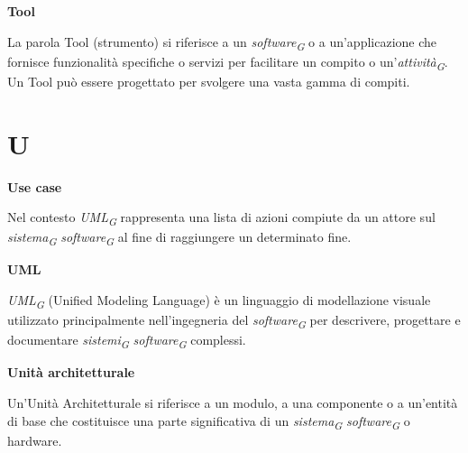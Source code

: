 \documentclass{article}
\begin{document}
\vspace{0.4cm}

\textbf{Tool}

\vspace{0.1cm}

La parola Tool (strumento) si riferisce a un \textit{software}\textsubscript{\textit{G}} o a un'applicazione che fornisce funzionalità specifiche o servizi per facilitare un compito o un'\textit{attività}\textsubscript{\textit{G}}. Un Tool può essere progettato per svolgere una vasta gamma di compiti.

\pagebreak
\section*{U}
{}

\vspace{0.4cm}

\textbf{Use case}

\vspace{0.1cm}

Nel contesto \textit{UML}\textsubscript{\textit{G}} rappresenta una lista di azioni compiute da un attore sul \textit{sistema}\textsubscript{\textit{G}} \textit{software}\textsubscript{\textit{G}} al fine di raggiungere un determinato fine.

\vspace{0.4cm}

\textbf{UML}

\vspace{0.1cm}

\textit{UML}\textsubscript{\textit{G}} (Unified Modeling Language) è un linguaggio di modellazione visuale utilizzato principalmente nell'ingegneria del \textit{software}\textsubscript{\textit{G}} per descrivere, progettare e documentare \textit{sistemi}\textsubscript{\textit{G}} \textit{software}\textsubscript{\textit{G}} complessi.

\vspace{0.4cm}

\textbf{Unità architetturale}

\vspace{0.1cm}

Un'Unità Architetturale si riferisce a un modulo, a una componente o a un'entità di base che costituisce una parte significativa di un \textit{sistema}\textsubscript{\textit{G}} \textit{software}\textsubscript{\textit{G}} o hardware. 

\vspace{0.4cm}
\end{document}
